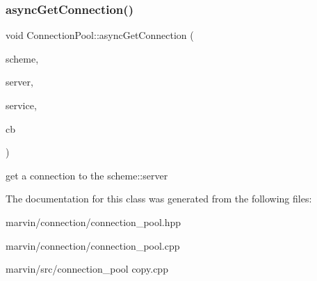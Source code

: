 \subsubsection{\texorpdfstring{async\+Get\+Connection()}{asyncGetConnection()}}
{\footnotesize\ttfamily void Connection\+Pool\+::async\+Get\+Connection (\begin{DoxyParamCaption}\item[{std\+::string}]{scheme,  }\item[{std\+::string}]{server,  }\item[{std\+::string}]{service,  }\item[{Connect\+Callback\+Type}]{cb }\end{DoxyParamCaption})}

get a connection to the scheme\+::server 

The documentation for this class was generated from the following files\+:\begin{DoxyCompactItemize}
\item 
marvin/connection/connection\+\_\+pool.\+hpp\item 
marvin/connection/connection\+\_\+pool.\+cpp\item 
marvin/src/connection\+\_\+pool copy.\+cpp\end{DoxyCompactItemize}
